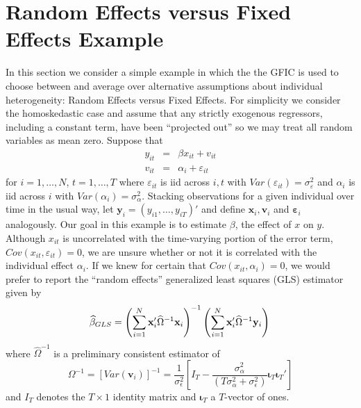 \section{Random Effects versus Fixed Effects Example}
\label{sec:REvsFE}
In this section we consider a simple example in which the the GFIC is used to choose between and average over alternative assumptions about individual heterogeneity: Random Effects versus Fixed Effects.
For simplicity we consider the homoskedastic case and assume that any strictly exogenous regressors, including a constant term, have been ``projected out'' so we may treat all random variables as mean zero.
Suppose that
\begin{eqnarray}
  y_{it} &=& \beta x_{it}+ v_{it}\\
  v_{it} &=& \alpha_i + \varepsilon_{it}
  \label{eq:REvsFEmodel}
\end{eqnarray}
for $i = 1, \hdots, N$, $t=1, \hdots, T$ where $\varepsilon_{it}$ is iid across $i,t$ with $Var(\varepsilon_{it}) = \sigma^2_{\varepsilon}$ and $\alpha_i$ is iid across $i$ with $Var\left( \alpha_i \right)=\sigma^2_{\alpha}$.
Stacking observations for a given individual over time in the usual way, let $\mathbf{y}_i = (y_{i1}, \hdots, y_{iT})'$ and define $\mathbf{x}_i, \mathbf{v}_i$ and $\boldsymbol{\varepsilon}_i$ analogously.
Our goal in this example is to estimate $\beta$, the effect of $x$ on $y$.
Although $x_{it}$ is uncorrelated with the time-varying portion of the error term, $Cov(x_{it},\varepsilon_{it})=0$, we are unsure whether or not it is correlated with the individual effect $\alpha_i$. 
If we knew for certain that $Cov(x_{it},\alpha_i)=0$, we would prefer to report the ``random effects'' generalized least squares (GLS) estimator given by
\begin{equation}
  \widehat{\beta}_{GLS} = \left(\sum_{i=1}^{N} \mathbf{x}_i' \widehat{\Omega}^{-1} \mathbf{x}_i\right)^{-1}\left(\sum_{i=1}^{N} \mathbf{x}_i'  \widehat{\Omega}^{-1} \mathbf{y}_i   \right)\\
  \label{eq:REdef}
\end{equation}
where $\widehat{\Omega}^{-1}$ is a preliminary consistent estimator of 
\begin{equation}
  \Omega^{-1} = [Var(\mathbf{v}_i)]^{-1} = \frac{1}{\sigma_\epsilon^2} \left[I_T - \frac{\sigma_\alpha^2}{(T\sigma_\alpha^2 + \sigma_\epsilon^2)} \boldsymbol{\iota}_T\boldsymbol{\iota}_T'\right]
  \label{eq:OmegaInvRE}
\end{equation}
and $I_T$ denotes the $T\times 1$ identity matrix and $\boldsymbol{\iota}_T$ a $T$-vector of ones.
